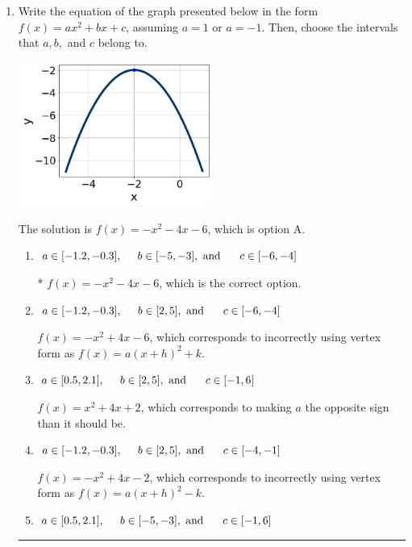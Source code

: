 \documentclass{extbook}[14pt]
\newcommand{\litem}[1]{\item #1

\rule{\textwidth}{0.4pt}}
\begin{document}
\begin{enumerate}\litem{
Write the equation of the graph presented below in the form $f(x)=ax^2+bx+c$, assuming  $a=1$ or $a=-1$. Then, choose the intervals that $a, b,$ and $c$ belong to.

\begin{center}
    \includegraphics[width=0.5\textwidth]{../Figures/quadraticGraphToEquationCopyC.png}
\end{center}




The solution is \( f(x) = -x^{2} -4 x -6 \), which is option A.\begin{enumerate}[label=\Alph*.]
\item \( a \in [-1.2, -0.3], \hspace*{5mm} b \in [-5, -3], \text{ and } \hspace*{5mm} c \in [-6, -4] \)

* $f(x)=-x^{2} -4 x -6$, which is the correct option.
\item \( a \in [-1.2, -0.3], \hspace*{5mm} b \in [2, 5], \text{ and } \hspace*{5mm} c \in [-6, -4] \)

$f(x)=-x^{2} +4 x -6$, which corresponds to incorrectly using vertex form as $f(x) = a(x+h)^2+k$.
\item \( a \in [0.5, 2.1], \hspace*{5mm} b \in [2, 5], \text{ and } \hspace*{5mm} c \in [-1, 6] \)

$f(x)=x^{2} +4 x + 2$, which corresponds to making $a$ the opposite sign than it should be.
\item \( a \in [-1.2, -0.3], \hspace*{5mm} b \in [2, 5], \text{ and } \hspace*{5mm} c \in [-4, -1] \)

$f(x)=-x^{2} +4 x -2$, which corresponds to incorrectly using vertex form as $f(x) = a(x+h)^2 - k$.
\item \( a \in [0.5, 2.1], \hspace*{5mm} b \in [-5, -3], \text{ and } \hspace*{5mm} c \in [-1, 6] \)


\end{enumerate}}
\end{enumerate}
\end{document}
